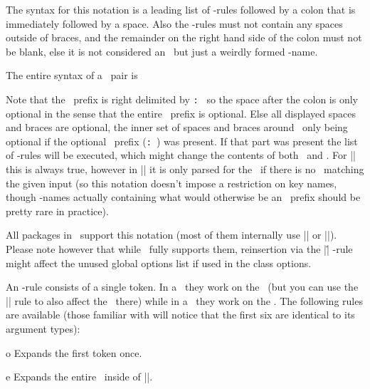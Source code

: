 The syntax for this notation is a leading list of \expansion-rules followed by a
colon that is immediately followed by a space. Also the \expansion-rules must
not contain any spaces outside of braces, and the remainder on the right hand
side of the colon must not be blank, else it is not considered an \expnotation\
but just a weirdly formed \key-name.

The entire syntax of a \kv\ pair is
\begin{syntaxexample}
\end{syntaxexample}
Note that the \expansion\ prefix is right delimited by \verb*|: | so the space
after the colon is only optional in the sense that the entire \expansion\ prefix
is optional. Else all displayed spaces and braces are optional, the inner set of
spaces and braces around \key\ only being optional if the optional \expansion\
prefix (\expansion\verb*|: |) was present. If that part was present the list of
\expansion-rules will be executed, which might change the contents of both \key\
and \val. For |\ekvparse| this is always true, however in |\ekvset| it is only
parsed for the \expnotation\ if there is no \key\ matching the given input (so
this notation doesn't impose a restriction on key names, though \key-names
actually containing what would otherwise be an \expansion\ prefix should be
pretty rare in practice).

All packages in \expkvbundle\ support this notation (most of them internally use
|\ekvset| or |\ekvparse|). Please note however that while \expkvo\ fully
supports them, reinsertion via the |\r| \expansion-rule might affect the unused
global options list if used in the class options.

An \expansion-rule consists of a single token. In a \Vkey\ they work on the
\val\ (but you can use the |\key| rule to also affect the \key\ there) while in
a \Nkey\ they work on the \key. The following rules are available (those
familiar with \pkg{expl3} will notice that the first six are identical to its
argument types):

\begingroup
\let\bigskip\medskip
\begin{function}[module=Expansion]{o}
  Expands the first token once.
\end{function}

\begin{function}[module=Expansion]{e}
  Expands the entire \val\ inside of |\expanded|.
\end{function}

